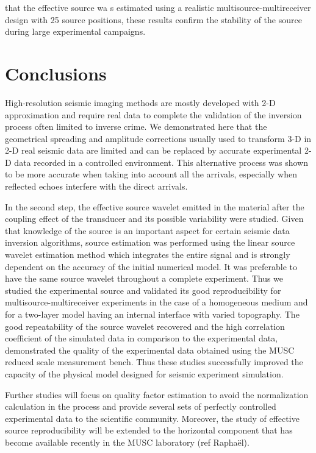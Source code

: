 \documentclass[paper,extra]{gji} %
\newcommand{\twod}{2-D }
\newcommand{\thrd}{3-D }
\begin{document}
that the effective source wa	s estimated using a realistic multisource-multireceiver design with 25 source positions, these results confirm the stability of the source during large experimental campaigns. 



\section{Conclusions}

\noindent High-resolution seismic imaging methods are mostly developed with \twod approximation and require real data to complete the validation of the inversion process often limited to inverse crime. We demonstrated here that the geometrical spreading and amplitude corrections usually used to transform \thrd in \twod real seismic data are limited and can be replaced by accurate experimental \twod data recorded in a controlled environment. This alternative process was shown to be more accurate when taking into account all the arrivals, especially when reflected echoes interfere with the direct arrivals.

\noindent In the second step, the effective source wavelet emitted in the material after the coupling effect of the transducer and its possible variability were studied. Given that knowledge of the source is an important aspect for certain seismic data inversion algorithms, source estimation was performed using the linear source wavelet estimation method which integrates the entire signal and is strongly dependent on the accuracy of the initial numerical model. It was preferable to have the same source wavelet throughout a complete experiment. Thus we studied the experimental source and validated its good reproducibility for multisource-multireceiver experiments in the case of a homogeneous medium and for a two-layer model having an internal interface with varied topography. The good repeatability of the source wavelet recovered and the high correlation coefficient of the simulated data in comparison to the experimental data, demonstrated the quality of the experimental data obtained using the MUSC reduced scale measurement bench. 
\noindent Thus these studies successfully improved the capacity of the physical model designed for seismic experiment simulation. 

\noindent Further studies will focus on quality factor estimation to avoid the normalization calculation in the process and provide several sets of perfectly controlled experimental data to the scientific community. Moreover, the study of effective source reproducibility will be extended to the horizontal component that has become available recently in the MUSC laboratory (ref Raphaël).
\end{document}

